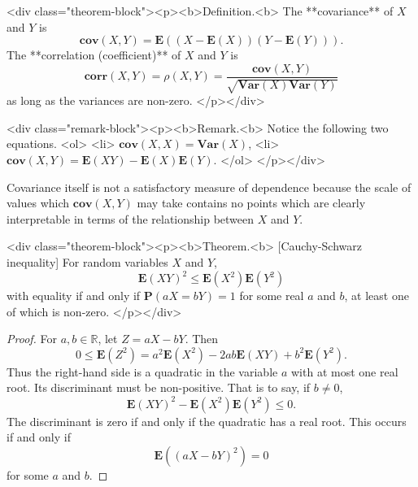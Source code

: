 <div class="theorem-block"><p><b>Definition.<b> 
The **covariance** of $X$ and $Y$ is
$$\begin{equation}
    \mathbf{cov}(X,Y) = \mathbf{E}\left( (X-\mathbf{E}(X))(Y-\mathbf{E}(Y)) \right).
\end{equation}$$
The **correlation (coefficient)** of $X$ and $Y$ is 
$$\begin{equation}
\mathbf{corr}(X, Y) = \rho(X,Y) = \frac{\mathbf{cov}(X,Y)}{\sqrt{\mathbf{Var}(X)\mathbf{Var}(Y)}}
\end{equation}$$
as long as the variances are non-zero. 
</p></div>

<div class="remark-block"><p><b>Remark.<b> 
Notice the following two equations.
<ol>
    <li> $\mathbf{cov}(X,X) = \mathbf{Var}(X)$,
    <li> $\mathbf{cov}(X,Y) = \mathbf{E}(XY) - \mathbf{E}(X)\mathbf{E}(Y)$.
</ol>
</p></div>

Covariance itself is not a satisfactory measure of dependence because the scale of values which $\mathbf{cov}(X, Y)$ may take contains no points which are clearly interpretable in terms of the relationship between $X$ and $Y$.

<div class="theorem-block"><p><b>Theorem.<b> [Cauchy-Schwarz inequality] For random variables $X$ and $Y$, 
$$\begin{equation}
    \mathbf{E}(XY)^2 \leq \mathbf{E}(X^2) \mathbf{E}(Y^2)
\end{equation}$$ 
with equality if and only if $\mathbf{P}(aX = bY) = 1$ for some real $a$ and $b$, at least one of which is non-zero. 
</p></div>

\begin{proof}
For $a, b \in \mathbb{R}$, let $Z = aX - bY$. Then 
$$\begin{equation}
    0 \leq \mathbf{E}(Z^2) = a^2 \mathbf{E}(X^2) - 2ab\mathbf{E}(XY) + b^2\mathbf{E}(Y^2).
\end{equation}$$
Thus the right-hand side is a quadratic in the variable $a$ with at most one real root. Its discriminant must be non-positive. That is to say, if $b \neq 0$, 
$$\begin{equation}
    \mathbf{E}(XY)^2 - \mathbf{E}(X^2) \mathbf{E}(Y^2) \leq 0. 
\end{equation}$$
The discriminant is zero if and only if the quadratic has a real root. This occurs if and only if 
$$\begin{equation}
    \mathbf{E}\left( (aX-bY)^2 \right) = 0
\end{equation}$$
for some $a$ and $b$.
\end{proof}

